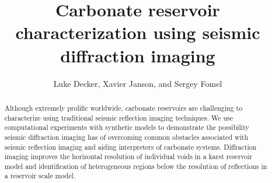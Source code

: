 \title{Carbonate reservoir characterization using seismic diffraction imaging}

\author{Luke Decker, Xavier Janson, and Sergey Fomel}
\maketitle
\begin{abstract}
Although extremely prolific worldwide, carbonate reservoirs are challenging to characterize using traditional seismic reflection imaging techniques.  We use computational experiments with synthetic models to demonstrate the possibility seismic diffraction imaging has of overcoming common obstacles associated with seismic reflection imaging and aiding interpreters of carbonate systems.  Diffraction imaging  improves the horizontal resolution of individual voids in a karst reservoir model and identification of heterogeneous regions below the resolution of reflections in a reservoir scale model. 
\end{abstract}

